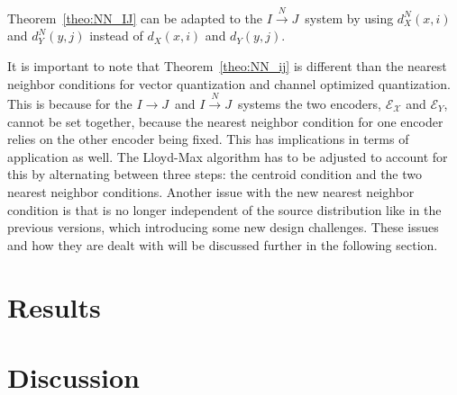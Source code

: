 \documentclass[10pt]{article}
\newcommand{\sysIJN}{\mbox{$I \overset{N}{\rightarrow} J$}}
\newcommand{\sysIJ}{\mbox{$I \rightarrow J$}}
\begin{document}
Theorem~\ref{theo:NN_IJ} can be adapted to the \sysIJN\ system by using $d_X^N(x,i)$ and $d_Y^N(y,j)$ instead of $d_X(x,i)$ and $d_Y(y,j)$.

It is important to note that Theorem~\ref{theo:NN_ij} is different than the nearest neighbor conditions for vector quantization and channel optimized quantization. This is because for the \sysIJ\ and \sysIJN\ systems the two encoders, $\mathcal{E_X}$ and $\mathcal{E}_Y$, cannot be set together, because the nearest neighbor condition for one encoder relies on the other encoder being fixed. This has implications in terms of application as well. The Lloyd-Max algorithm has to be adjusted to account for this by alternating between three steps: the centroid condition and the two nearest neighbor conditions. Another issue with the new nearest neighbor condition is that is no longer independent of the source distribution like in the previous versions, which introducing some new design challenges. These issues and how they are dealt with will be discussed further in the following section.

\section{Results}


\section{Discussion}
\end{document}
